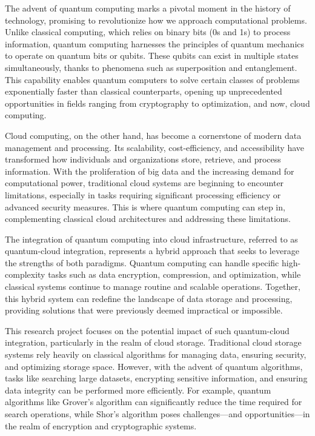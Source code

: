 \documentclass[12pt,a4paper]{article}
\begin{document}
The advent of quantum computing marks a pivotal moment in the history of technology, promising to revolutionize how we approach computational problems. Unlike classical computing, which relies on binary bits (0s and 1s) to process information, quantum computing harnesses the principles of quantum mechanics to operate on quantum bits or qubits. These qubits can exist in multiple states simultaneously, thanks to phenomena such as superposition and entanglement. This capability enables quantum computers to solve certain classes of problems exponentially faster than classical counterparts, opening up unprecedented opportunities in fields ranging from cryptography to optimization, and now, cloud computing.  

Cloud computing, on the other hand, has become a cornerstone of modern data management and processing. Its scalability, cost-efficiency, and accessibility have transformed how individuals and organizations store, retrieve, and process information. With the proliferation of big data and the increasing demand for computational power, traditional cloud systems are beginning to encounter limitations, especially in tasks requiring significant processing efficiency or advanced security measures. This is where quantum computing can step in, complementing classical cloud architectures and addressing these limitations.  

The integration of quantum computing into cloud infrastructure, referred to as quantum-cloud integration, represents a hybrid approach that seeks to leverage the strengths of both paradigms. Quantum computing can handle specific high-complexity tasks such as data encryption, compression, and optimization, while classical systems continue to manage routine and scalable operations. Together, this hybrid system can redefine the landscape of data storage and processing, providing solutions that were previously deemed impractical or impossible.  

This research project focuses on the potential impact of such quantum-cloud integration, particularly in the realm of cloud storage. Traditional cloud storage systems rely heavily on classical algorithms for managing data, ensuring security, and optimizing storage space. However, with the advent of quantum algorithms, tasks like searching large datasets, encrypting sensitive information, and ensuring data integrity can be performed more efficiently. For example, quantum algorithms like Grover’s algorithm can significantly reduce the time required for search operations, while Shor’s algorithm poses challenges—and opportunities—in the realm of encryption and cryptographic systems.  
\end{document}
